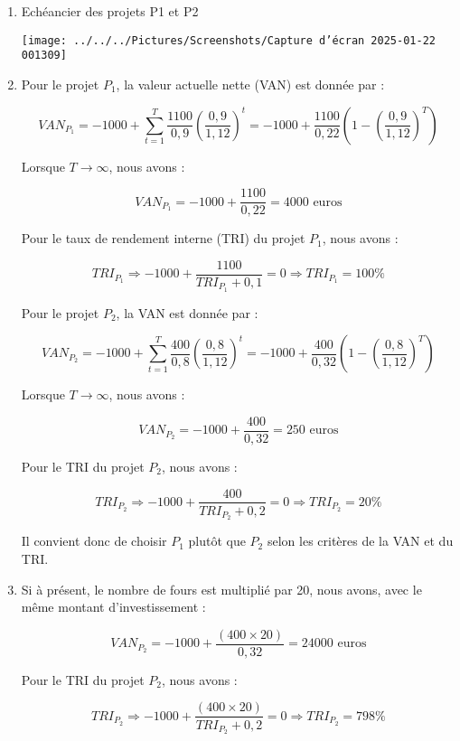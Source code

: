 \documentclass[a4paper, 12pt]{report}
\begin{document}
\begin{enumerate}
	\item Echéancier des projets P1 et P2 
	
\begin{center}
	\texttt{[image: ../../../Pictures/Screenshots/Capture d'écran 2025-01-22 001309]}
\end{center}

\item Pour le projet \( P_1 \), la valeur actuelle nette (VAN) est donnée par :

\[
VAN_{P_1} = -1000 + \sum_{t=1}^{T} \frac{1100}{0,9} \left( \frac{0,9}{1,12} \right)^{t} = -1000 + \frac{1100}{0,22} \left( 1 - \left( \frac{0,9}{1,12} \right)^{T} \right)
\]

Lorsque \( T \to \infty \), nous avons :

\[
VAN_{P_1} = -1000 + \frac{1100}{0,22} = 4000 \text{ euros}
\]

Pour le taux de rendement interne (TRI) du projet \( P_1 \), nous avons :

\[
TRI_{P_1} \Rightarrow -1000 + \frac{1100}{TRI_{P_1} + 0,1} = 0 \Rightarrow TRI_{P_1} = 100\%
\]

Pour le projet \( P_2 \), la VAN est donnée par :

\[
VAN_{P_2} = -1000 + \sum_{t=1}^{T} \frac{400}{0,8} \left( \frac{0,8}{1,12} \right)^{t} = -1000 + \frac{400}{0,32} \left( 1 - \left( \frac{0,8}{1,12} \right)^{T} \right)
\]

Lorsque \( T \to \infty \), nous avons :

\[
VAN_{P_2} = -1000 + \frac{400}{0,32} = 250 \text{ euros}
\]

Pour le TRI du projet \( P_2 \), nous avons :

\[
TRI_{P_2} \Rightarrow -1000 + \frac{400}{TRI_{P_2} + 0,2} = 0 \Rightarrow TRI_{P_2} = 20\%
\]

Il convient donc de choisir \( P_1 \) plutôt que \( P_2 \) selon les critères de la VAN et du TRI.

\item Si à présent, le nombre de fours est multiplié par 20, nous avons, avec le même montant d'investissement :

\[
VAN_{P_2} = -1000 + \frac{(400 \times 20)}{0,32} = 24000 \text{ euros}
\]

Pour le TRI du projet \( P_2 \), nous avons :

\[
TRI_{P_2} \Rightarrow -1000 + \frac{(400 \times 20)}{TRI_{P_2} + 0,2} = 0 \Rightarrow TRI_{P_2} = 798\%
\]


\end{enumerate}
\end{document}
